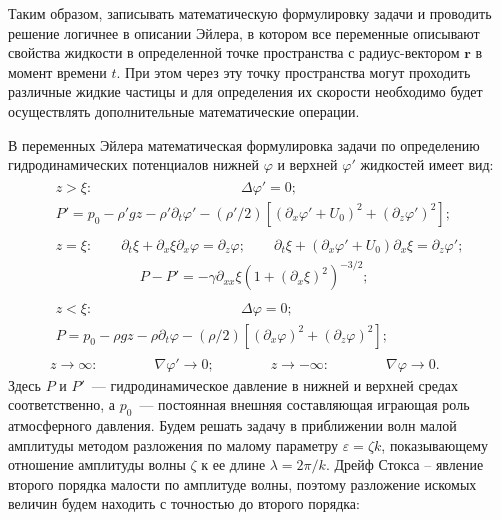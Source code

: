 Таким образом, записывать математическую формулировку задачи и проводить решение логичнее в описании Эйлера, в котором все переменные описывают свойства жидкости в определенной точке пространства с радиус-вектором $ \mathbf{r} $ в момент времени $ t $. При этом через эту точку пространства могут проходить различные жидкие частицы и для определения их скорости необходимо будет осуществлять дополнительные математические операции.

В переменных Эйлера математическая формулировка задачи по определению гидродинамических потенциалов нижней $ \varphi $ и верхней $ \varphi ' $ жидкостей имеет вид: 
\begin{gather}
\begin{gathered}
z>\xi :\mspace{190mu}  \Delta \varphi'=0;\mspace{190mu} \\
 P'=p_{0}-\rho' g z-\rho' \partial_{t}\varphi' - \left( \rho' /2 \right) \left[ \left( \partial_{x} \varphi' +U_{0}\right)^{2} +\left( \partial_{z} \varphi' \right)^{2}\right] ;\label{Euler}
\end{gathered}
\\
\begin{gathered}
z=\xi : \qquad \partial_{t}\xi + \partial_{x} \xi \partial_{x}\varphi =\partial_{z} \varphi ;\qquad  \partial_{t}\xi + \left( \partial_{x}\varphi' +U_{0} \right)  \partial_{x} \xi =\partial_{z} \varphi' ;
\\
\qquad \qquad \qquad P-P'=-\gamma \partial_{xx}\xi \left( 1+\left( \partial_{x} \xi\right)^{2} \right)^{-3/2} ;
\end{gathered}\label{GrUsl}
\\
\begin{gathered}
z<\xi : \mspace{190mu} \Delta \varphi=0;\mspace{190mu}\\
P=p_{0}-\rho g z-\rho \partial_{t}\varphi - \left( \rho /2 \right) \left[ \left( \partial_{x} \varphi\right)^{2} +\left( \partial_{z} \varphi \right)^{2}\right] ;\label{Euler2}
\end{gathered}
\\
z\rightarrow \infty : \qquad \qquad \nabla \varphi' \rightarrow 0 ;\qquad \qquad z\rightarrow -\infty :\qquad \qquad \nabla \varphi \rightarrow 0.\label{BeskUsl}
\end{gather}
 Здесь $ P $ и $ P' $~--- гидродинамическое давление в нижней и верхней средах соответственно, а $ p_{0} $~--- постоянная внешняя составляющая играющая роль атмосферного давления. 
Будем решать задачу в приближении волн малой амплитуды методом разложения по малому параметру $ \varepsilon = \zeta k $, показывающему отношение амплитуды волны $ \zeta $ к ее длине $ \lambda=2\pi /k $. Дрейф Стокса – явление второго порядка малости по амплитуде волны, поэтому разложение искомых величин будем находить с точностью до второго порядка:

